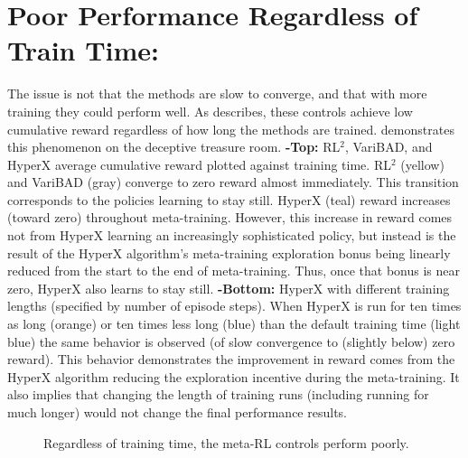 \documentclass{article}
\begin{document}
\section{Poor Performance Regardless of Train Time:}
\label{sec:training-time-scale}
The issue is not that the methods are slow to converge, and that with more training they could perform well. As  describes, these controls achieve low cumulative reward regardless of how long the methods are trained.  demonstrates this phenomenon on the deceptive treasure room.
\textbf{-Top:} RL\(^2\), VariBAD, and HyperX average cumulative reward plotted against training time. RL\(^2\) (yellow) and VariBAD (gray) converge to zero reward almost immediately. This transition corresponds to the policies learning to stay still. HyperX (teal) reward increases (toward zero) throughout meta-training. However, this increase in reward comes not from HyperX learning an increasingly sophisticated policy, but instead is the result of the HyperX algorithm’s meta-training exploration bonus being linearly reduced from the start to the end of meta-training. Thus, once that bonus is near zero, HyperX also learns to stay still.
\textbf{-Bottom:} HyperX with different training lengths (specified by number of episode steps). When HyperX is run for ten times as long (orange) or ten times less long (blue) than the default training time (light blue) the same behavior is observed (of slow convergence to (slightly below) zero reward). This behavior demonstrates the improvement in reward comes from the HyperX algorithm reducing the exploration incentive during the meta-training. It also implies that changing the length of training runs (including running for much longer) would not change the final performance results.
\begin{figure}[!h]
\centering

\caption{Regardless of training time, the meta-RL controls perform poorly.}
\label{fig:control_train}
\end{figure}
\FloatBarrier
\clearpage
\pagebreak
\end{document}

